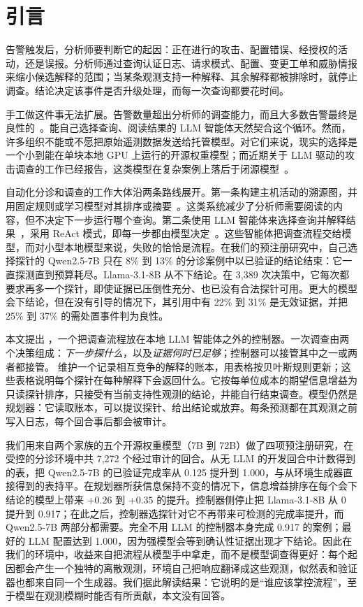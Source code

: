 \section{引言}
\label{sec:intro}

告警触发后，分析师要判断它的起因：正在进行的攻击、配置错误、经授权的活动，还是误报。分析师通过查询认证日志、请求模式、配置、变更工单和威胁情报来缩小候选解释的范围；当某条观测支持一种解释、其余解释都被排除时，就停止调查。结论决定该事件是否升级处理，而每一次查询都要花时间。

手工做这件事无法扩展。告警数量超出分析师的调查能力，而且大多数告警最终是良性的~\citep{nodoze}。能自己选择查询、阅读结果的 LLM 智能体天然契合这个循环。然而，许多组织不能或不愿把原始遥测数据发送给托管模型。对它们来说，现实的选择是一个小到能在单块本地 GPU 上运行的开源权重模型；而近期关于 LLM 驱动的攻击调查的工作已经报告，这类模型在复杂案例上落后于闭源模型~\citep{clouseau}。

自动化分诊和调查的工作大体沿两条路线展开。第一条构建主机活动的溯源图，并用固定规则或学习模型对其排序或摘要~\citep{nodoze,kairos}。这类系统减少了分析师需要阅读的内容，但不决定下一步运行哪个查询。第二条使用 LLM 智能体来选择查询并解释结果~\citep{excytin,clouseau}，采用 ReAct 模式，即每一步都由模型决定~\citep{react}。这些智能体把调查流程交给模型，而对小型本地模型来说，失败的恰恰是流程。在我们的预注册研究中，自己选择探针的 Qwen2.5-7B 只在 8\% 到 13\% 的分诊案例中以已验证的结论结束：它一直探测直到预算耗尽。Llama-3.1-8B 从不下结论。在 3{,}389 次决策中，它每次都要求再多一个探针，即使证据已压倒性充分、也已没有合法探针可用。更大的模型会下结论，但在没有引导的情况下，其引用中有 22\% 到 31\% 是无效证据，并把 25\% 到 37\% 的需处置事件判为良性。

本文提出 \hesp{}，一个把调查流程放在本地 LLM 智能体之外的控制器。一次调查由两个决策组成：\emph{下一步探什么}，以及\emph{证据何时已足够}；控制器可以接管其中之一或两者都接管。\hesp{} 维护一个记录相互竞争的解释的账本，用表格按贝叶斯规则更新；这些表格说明每个探针在每种解释下会返回什么。它按每单位成本的期望信息增益为只读探针排序，只接受有当前支持性观测的结论，并能自行结束调查。模型仍然是规划器：它读取账本，可以提议探针、给出结论或放弃。每条预测都在其观测之前写入日志，每个回合事后都会被审计。

我们用来自两个家族的五个开源权重模型（7B 到 72B）做了四项预注册研究，在受控的分诊环境中共 7{,}272 个经过审计的回合。从无 LLM 的开发回合中计数得到的表，把 Qwen2.5-7B 的已验证完成率从 0.125 提升到 1.000，与从环境生成器直接得到的表持平。在规划器所获信息保持不变的情况下，信息增益排序在每个会下结论的模型上带来 $+0.26$ 到 $+0.35$ 的提升。控制器侧停止把 Llama-3.1-8B 从 0 提升到 0.917；在此之后，控制器选探针对它不再带来可检测的完成率提升，而 Qwen2.5-7B 两部分都需要。完全不用 LLM 的控制器本身完成 0.917 的案例；最好的 LLM 配置达到 1.000，因为强模型会等到确认性证据出现才下结论。因此在我们的环境中，收益来自把流程从模型手中拿走，而不是模型调查得更好：每个起因都会产生一个独特的离散观测，环境自己把响应翻译成这些观测，似然表和验证器也都来自同一个生成器。我们据此解读结果：它说明的是“谁应该掌控流程”，至于模型在观测模糊时能否有所贡献，本文没有回答。


